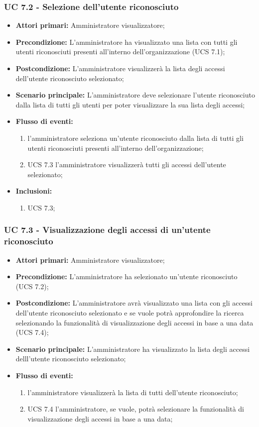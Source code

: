 \subsubsection{UC 7.2 - Selezione dell'utente riconosciuto }
\begin{itemize}
\item \textbf{Attori primari:} Amministratore visualizzatore;
\item \textbf{Precondizione:} L'amministratore ha visualizzato una lista con tutti gli utenti riconosciuti presenti all'interno dell'organizzazione (UCS 7.1);
\item \textbf{Postcondizione:} L'amministratore visualizzerà la lista degli accessi dell'utente riconosciuto selezionato;
\item \textbf{Scenario principale:} L'amministratore deve selezionare l'utente riconosciuto dalla lista di tutti gli utenti per poter visualizzare la sua lista degli accessi;
\item \textbf{Flusso di eventi:} 
	\begin{enumerate}
		\item l'amministratore seleziona un'utente riconosciuto dalla lista di tutti gli utenti riconosciuti presenti all'interno dell'organizzazione;
		\item UCS 7.3 l'amministratore visualizzerà tutti gli accessi dell'utente selezionato;
	\end{enumerate}
	\item \textbf{Inclusioni:}
	\begin{enumerate}
		\item UCS 7.3;
	\end{enumerate}
\end{itemize}

\subsubsection{UC 7.3 - Visualizzazione degli accessi di un'utente riconosciuto }
\begin{itemize}
	\item \textbf{Attori primari:} Amministratore visualizzatore;
	\item \textbf{Precondizione:} L'amministratore ha selezionato un'utente riconosciuto (UCS 7.2);
	\item \textbf{Postcondizione:} L'amministratore avrà visualizzato una lista con gli accessi dell'utente riconosciuto selezionato e se vuole potrà approfondire la ricerca selezionando la funzionalità di visualizzazione degli accessi in base a una data (UCS 7.4);
	\item \textbf{Scenario principale:} L'amministratore ha visualizzato la lista degli accessi delll'utente riconosciuto selezionato;
	\item \textbf{Flusso di eventi:} 
	\begin{enumerate}
		\item l'amministratore visualizzerà la lista di tutti dell'utente riconosciuto;
		\item UCS 7.4 l'amministratore, se vuole, potrà selezionare la funzionalità di visualizzazione degli accessi in base a una data;
	\end{enumerate}
\end{itemize}


